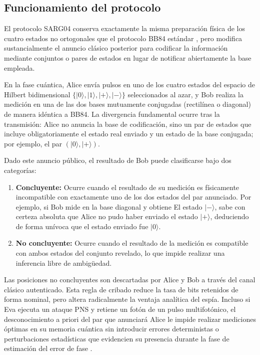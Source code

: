 \subsection{Funcionamiento del protocolo}
El protocolo SARG04 conserva exactamente la misma preparación física de los cuatro estados no ortogonales que el protocolo BB84 estándar \citep{bennett1984, scarani2004}, pero modifica sustancialmente el anuncio clásico posterior para codificar la información mediante conjuntos o pares de estados en lugar de notificar abiertamente la base empleada.

En la fase cuántica, Alice envía pulsos en uno de los cuatro estados del espacio de Hilbert bidimensional $\{|0\rangle, |1\rangle, |+\rangle, |-\rangle\}$ seleccionados al azar, y Bob realiza la medición en una de las dos bases mutuamente conjugadas (rectilínea o diagonal) de manera idéntica a BB84. La divergencia fundamental ocurre tras la transmisión: Alice no anuncia la base de codificación, sino un par de estados que incluye obligatoriamente el estado real enviado y un estado de la base conjugada; por ejemplo, el par $(|0\rangle, |+\rangle)$. 

Dado este anuncio público, el resultado de Bob puede clasificarse bajo dos categorías:
\begin{enumerate}
    \item \textbf{Concluyente:} Ocurre cuando el resultado de su medición es físicamente incompatible con exactamente uno de los dos estados del par anunciado. Por ejemplo, si Bob mide en la base diagonal y obtiene El estado $|-\rangle$, sabe con certeza absoluta que Alice no pudo haber enviado el estado $|+\rangle$, deduciendo de forma unívoca que el estado enviado fue $|0\rangle$.
    \item \textbf{No concluyente:} Ocurre cuando el resultado de la medición es compatible con ambos estados del conjunto revelado, lo que impide realizar una inferencia libre de ambigüedad.
\end{enumerate}

Las posiciones no concluyentes son descartadas por Alice y Bob a través del canal clásico autenticado. Esta regla de cribado reduce la tasa de bits retenidos de forma nominal, pero altera radicalmente la ventaja analítica del espía. Incluso si Eva ejecuta un ataque PNS y retiene un fotón de un pulso multifotónico, el desconocimiento a priori del par que anunciará Alice le impide realizar mediciones óptimas en su memoria cuántica sin introducir errores deterministas o perturbaciones estadísticas que evidencien su presencia durante la fase de estimación del error de fase \citep{scarani2004}. 

